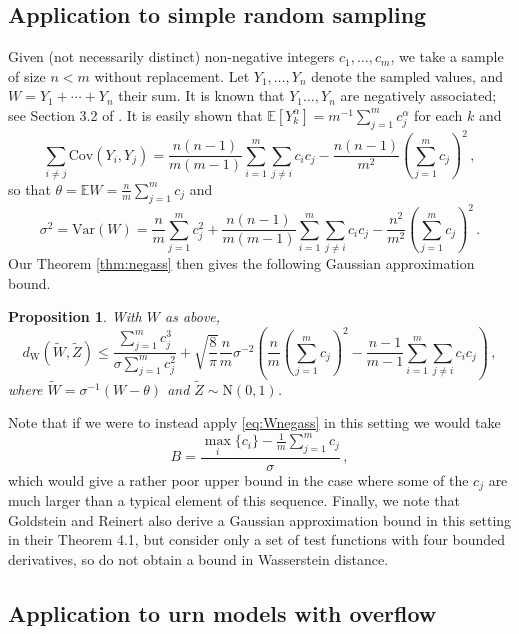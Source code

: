 \documentclass[12pt]{article}
\newtheorem{proposition}[theorem]{Proposition}
\begin{document}
\subsection{Application to simple random sampling}\label{subsec:normal_sample}

Given (not necessarily distinct) non-negative integers $c_1,\ldots,c_m$, we take a sample of size $n<m$ without replacement. Let $Y_1,\ldots,Y_n$ denote the sampled values, and $W=Y_1+\cdots+Y_n$ their sum. It is known that $Y_1\ldots,Y_n$ are negatively associated; see Section 3.2 of \cite{joagdev83}. It is easily shown that $\mathbb{E}[Y_k^\alpha]=m^{-1}\sum_{j=1}^mc_j^\alpha$ for each $k$ and
\[
\sum_{i\not=j}\text{Cov}(Y_i,Y_j)=\frac{n(n-1)}{m(m-1)}\sum_{i=1}^m\sum_{j\not=i}c_ic_j-\frac{n(n-1)}{m^2}\left(\sum_{j=1}^mc_j\right)^2\,,
\]
so that $\theta=\mathbb{E}W=\frac{n}{m}\sum_{j=1}^mc_j$ and
\[
\sigma^2=\text{Var}(W)=\frac{n}{m}\sum_{j=1}^mc_j^2+\frac{n(n-1)}{m(m-1)}\sum_{i=1}^m\sum_{j\not=i}c_ic_j-\frac{n^2}{m^2}\left(\sum_{j=1}^mc_j\right)^2\,.
\]
Our Theorem \ref{thm:negass} then gives the following Gaussian approximation bound.
\begin{proposition}
With $W$ as above,
\[
d_\text{W}(\widetilde{W},\widetilde{Z})\leq\frac{\sum_{j=1}^mc_j^3}{\sigma\sum_{j=1}^mc_j^2}+\sqrt{\frac{8}{\pi}}\frac{n}{m}\sigma^{-2}\left(\frac{n}{m}\left(\sum_{j=1}^mc_j\right)^2-\frac{n-1}{m-1}\sum_{i=1}^m\sum_{j\not=i}c_ic_j\right)\,,
\]
where $\widetilde{W}=\sigma^{-1}(W-\theta)$ and $\widetilde{Z}\sim\text{N}(0,1)$.
\end{proposition}
Note that if we were to instead apply \eqref{eq:Wnegass} in this setting we would take
\[
B=\frac{\max_i\{c_i\}-\frac{1}{m}\sum_{j=1}^mc_j}{\sigma}\,,
\]
which would give a rather poor upper bound in the case where some of the $c_j$ are much larger than a typical element of this sequence. Finally, we note that Goldstein and Reinert \cite{goldstein97} also derive a Gaussian approximation bound in this setting in their Theorem 4.1, but consider only a set of test functions with four bounded derivatives, so do not obtain a bound in Wasserstein distance. 

\subsection{Application to urn models with overflow}\label{subsec:overflow}
\end{document}
